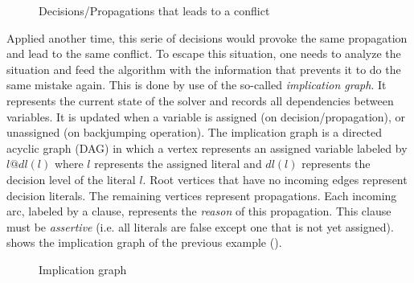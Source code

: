 \begin{figure}[!htbp]
 \centering
  
 \caption{Decisions/Propagations that leads to a  conflict}
 \label{fig:conflict}
\end{figure}

\clearpage

Applied another time, this serie of decisions would provoke the same propagation and lead to the same conflict. 
To escape this situation, one needs to analyze the situation and feed the algorithm with the information that prevents it to do the 
same mistake again. This is done by use of the so-called \emph{implication graph}.
It represents the current state of the solver and records all dependencies between  variables. It is updated when a variable is assigned 
(on decision/propagation), or unassigned (on backjumping operation). The implication graph is a directed acyclic graph (DAG) in which a vertex represents an assigned variable labeled by $\mathit{l@dl(l)}$ where $l$ represents the assigned literal and $\mathit{dl(l)}$ represents the decision level of the literal $l$.
Root vertices that have no incoming edges represent decision literals. The remaining vertices represent
propagations.
Each incoming arc, labeled by a clause, represents the \emph{reason} of this propagation.
This clause must be \textit{assertive} (i.e. all  literals are false except one that is not yet assigned).
 shows the implication graph of the previous example ().

\begin{figure}[!htbp]
 \centering
 
 \caption{Implication graph}
 \label{fig:implication-graph}
\end{figure}

